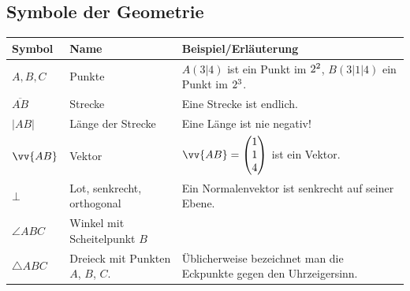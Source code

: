 \documentclass[ngerman, 12pt]{nssheetxea}
\begin{document}
\subsection{Symbole der Geometrie}
\renewcommand{\arraystretch}{1.3}
\begin{tabularx}{\textwidth}{p{2cm} p{6.5cm} X}
Symbol & Name & Beispiel/Erläuterung \\
\toprule
$A,B,C$ & Punkte & $A(3|4)$ ist ein Punkt im $2^2$, $B(3|1|4)$ ein Punkt im $2^3$. \\
$\overline{AB}$ & Strecke & Eine Strecke ist endlich. \\
$|AB|$ & Länge der Strecke & Eine Länge ist nie negativ! \\
$\vv{AB}$ & Vektor & $\vv{AB}=\colvec[1]{1}{4}$ ist ein Vektor. \\
\midrule
$\bot$ & Lot, senkrecht, orthogonal & Ein Normalenvektor ist senkrecht auf seiner Ebene. \\
$\angle ABC$ & Winkel mit Scheitelpunkt $B$ & \\
$\triangle ABC$ & Dreieck mit Punkten $A$, $B$, $C$. & Üblicherweise bezeichnet man die Eckpunkte gegen den Uhrzeigersinn. \\
\bottomrule
\end{tabularx}
\renewcommand{\arraystretch}{1}


\renewcommand{\indexname}{Stichwortverzeichnis}
\pagestyle{skript}
\pagestyle{skript}

\printindex
\thispagestyle{skript}
\end{document}
